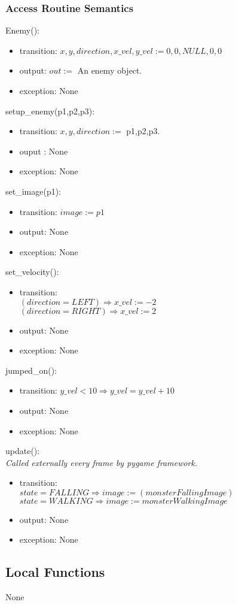 \documentclass[12pt]{article}
\begin{document}
\subsubsection* {Access Routine Semantics}

Enemy():
\begin{itemize}
\item transition: $x, y, direction, x\_vel, y\_vel := 0, 0, NULL, 0, 0 $
\item output: $out := $ An enemy object.
\item exception: None\\
\end{itemize}

\noindent setup\_enemy(p1,p2,p3):
\begin{itemize}
\item transition: $x,y,direction := $ p1,p2,p3.
\item ouput : None
\item exception: None\\
\end{itemize}

\noindent set\_image(p1):
\begin{itemize}
\item transition: $image := p1$
\item output: None
\item exception: None
\end{itemize}

\noindent set\_velocity():
\begin{itemize}
\item transition: 
\\
$ (direction = LEFT) \Rightarrow x\_vel := -2$\\
$ (direction = RIGHT) \Rightarrow x\_vel := 2$\\
\item output: None
\item exception: None
\end{itemize}

\noindent jumped\_on():
\begin{itemize}
\item transition: 
$y\_vel < 10 \Rightarrow y\_vel = y\_vel + 10$
\item output: None
\item exception: None
\end{itemize}

\noindent update():\\
\textit{Called externally every frame by pygame framework.}
\begin{itemize}
\item transition:\\
$state=FALLING \Rightarrow image := (monsterFallingImage)$\\
$state=WALKING \Rightarrow image := monsterWalkingImage$
\item output: None
\item exception: None
\end{itemize}
\subsection*{Local Functions}
None
\newpage
\end{document}
